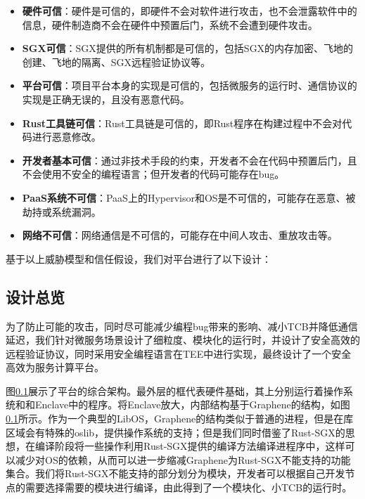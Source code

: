 \begin{itemize}
    \item \textbf{硬件可信}：硬件是可信的，即硬件不会对软件进行攻击，也不会泄露软件中的信息，硬件制造商不会在硬件中预置后门，系统不会遭到硬件攻击。
    \item \textbf{SGX可信}：SGX提供的所有机制都是可信的，包括SGX的内存加密、飞地的创建、飞地的隔离、SGX远程验证协议等。
    \item \textbf{平台可信}：项目平台本身的实现是可信的，包括微服务的运行时、通信协议的实现是正确无误的，且没有恶意代码。
    \item \textbf{Rust工具链可信}：Rust工具链是可信的，即Rust程序在构建过程中不会对代码进行恶意修改。
    \item \textbf{开发者基本可信}：通过非技术手段的约束，开发者不会在代码中预置后门，且不会使用不安全的编程语言；但开发者的代码可能存在bug。
    \item \textbf{PaaS系统不可信}：PaaS上的Hypervisor和OS是不可信的，可能存在恶意、被劫持或系统漏洞。
    \item \textbf{网络不可信}：网络通信是不可信的，可能存在中间人攻击、重放攻击等。
\end{itemize}

基于以上威胁模型和信任假设，我们对平台进行了以下设计：

\subsection{设计总览}

为了防止可能的攻击，同时尽可能减少编程bug带来的影响、减小TCB并降低通信延迟，我们针对微服务场景设计了细粒度、模块化的运行时，并设计了安全高效的远程验证协议，同时采用安全编程语言在TEE中进行实现，最终设计了一个安全高效为服务计算平台。


图\ref{}展示了平台的综合架构。最外层的框代表硬件基础，其上分别运行着操作系统和和Enclave中的程序。将Enclave放大，内部结构基于Graphene的结构，如图\ref{}所示。作为一个典型的LibOS，Graphene的结构类似于普通的进程，但是在库区域会有特殊的oslib，提供操作系统的支持；但是我们同时借鉴了Rust-SGX的思想，在编译阶段将一些操作利用Rust-SGX提供的编译方法编译进程序中，这样可以减少对OS的依赖，从而可以进一步缩减Graphene为Rust-SGX不能支持的功能集合。我们将Rust-SGX不能支持的部分划分为模块，开发者可以根据自己开发节点的需要选择需要的模块进行编译，由此得到了一个模块化、小TCB的运行时。

